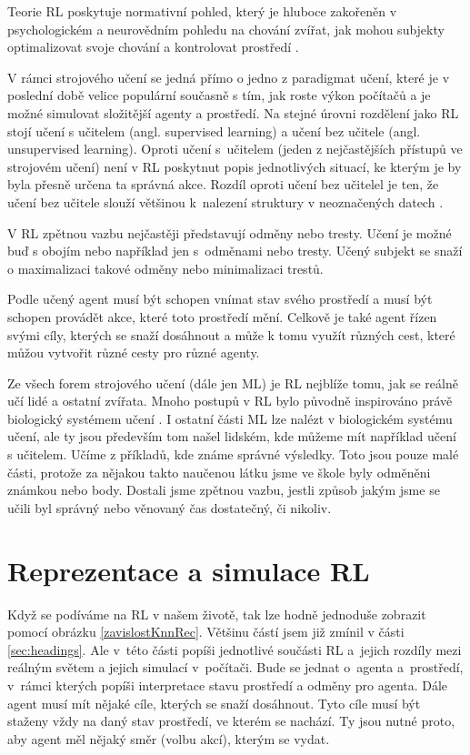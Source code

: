 \documentclass{article}
\begin{document}
Teorie RL poskytuje normativní pohled, který je hluboce zakořeněn v psychologickém a neurovědním pohledu na chování zvířat, jak mohou subjekty optimalizovat svoje chování a kontrolovat prostředí \cite{mnih2015human}. 

V rámci strojového učení se jedná přímo o jedno z paradigmat učení, které je v poslední době velice populární současně s tím, jak roste výkon počítačů a je možné simulovat složitější agenty a prostředí. Na stejné úrovni rozdělení jako RL stojí učení s učitelem (angl. supervised learning) a učení bez učitele (angl. unsupervised learning). Oproti učení s~učitelem (jeden z nejčastějších přístupů ve strojovém učení) není v RL poskytnut popis jednotlivých situací, ke kterým je by byla přesně určena ta správná akce. Rozdíl oproti učení bez učitelel je ten, že učení bez učitele slouží většinou k~nalezení struktury v neoznačených datech \cite{sutton1998introduction}.

V RL zpětnou vazbu nejčastěji představují odměny nebo tresty. Učení je možné buď s obojím nebo například jen s~odměnami nebo tresty. Učený subjekt se snaží o maximalizaci takové odměny nebo minimalizaci trestů. 

Podle \cite{sutton1998introduction} učený agent musí být schopen vnímat stav svého prostředí a musí být schopen provádět akce, které toto prostředí mění. Celkově je také agent řízen svými cíly, kterých se snaží dosáhnout a může k tomu využít různých cest, které můžou vytvořit různé cesty pro různé agenty.

Ze všech forem strojového učení (dále jen ML) je RL nejblíže tomu, jak se reálně učí lidé a ostatní zvířata. Mnoho postupů v RL bylo původně inspirováno právě biologický systémem učení \cite{sutton1998introduction}. I ostatní části ML lze nalézt v biologickém systému učení, ale ty jsou především tom našel lidském, kde můžeme mít například učení s učitelem. Učíme z příkladů, kde známe správné výsledky. Toto jsou pouze malé části, protože za nějakou takto naučenou látku jsme ve škole byly odměněni známkou nebo body. Dostali jsme zpětnou vazbu, jestli způsob jakým jsme se učili byl správný nebo věnovaný čas dostatečný, či nikoliv.

 
\section{Reprezentace a simulace RL}

Když se podíváme na RL v našem životě, tak lze hodně jednoduše zobrazit pomocí obrázku \ref{zavislostKnnRec}. Většinu částí jsem již zmínil v části \ref{sec:headings}. Ale v~této části popíši jednotlivé součásti RL a~jejich rozdíly mezi reálným světem a jejich simulací v~počítači. Bude se jednat o~agenta a~prostředí, v~rámci kterých popíši interpretace stavu prostředí a odměny pro agenta.
Dále agent musí mít nějaké cíle, kterých se snaží dosáhnout. Tyto cíle musí být staženy vždy na daný stav prostředí, ve kterém se nachází. Ty jsou nutné proto, aby agent měl nějaký směr (volbu akcí), kterým se vydat. 
\end{document}
